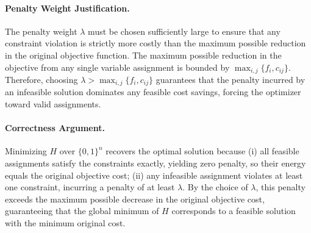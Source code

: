 \documentclass[12pt]{article}
\begin{document}
\paragraph{Penalty Weight Justification.}
The penalty weight $\lambda$ must be chosen sufficiently large to ensure that any constraint violation is strictly more costly than the maximum possible reduction in the original objective function. The maximum possible reduction in the objective from any single variable assignment is bounded by $\max_{i,j} \{f_i, c_{ij}\}$. Therefore, choosing $\lambda > \max_{i,j} \{f_i, c_{ij}\}$ guarantees that the penalty incurred by an infeasible solution dominates any feasible cost savings, forcing the optimizer toward valid assignments.

\paragraph{Correctness Argument.}
Minimizing $H$ over $\{0,1\}^n$ recovers the optimal solution because (i) all feasible assignments satisfy the constraints exactly, yielding zero penalty, so their energy equals the original objective cost; (ii) any infeasible assignment violates at least one constraint, incurring a penalty of at least $\lambda$. By the choice of $\lambda$, this penalty exceeds the maximum possible decrease in the original objective cost, guaranteeing that the global minimum of $H$ corresponds to a feasible solution with the minimum original cost.
\end{document}
